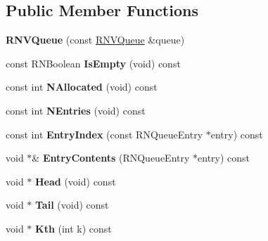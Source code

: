 \subsection*{Public Member Functions}
\begin{DoxyCompactItemize}
\item 
{\bfseries R\+N\+V\+Queue} (const \hyperlink{class_r_n_v_queue}{R\+N\+V\+Queue} \&queue)\hypertarget{class_r_n_v_queue_abbb0f5cc83d71dc73a498c4c40eacc3b}{}\label{class_r_n_v_queue_abbb0f5cc83d71dc73a498c4c40eacc3b}

\item 
const R\+N\+Boolean {\bfseries Is\+Empty} (void) const \hypertarget{class_r_n_v_queue_acb3c97678ea4be0dc74decf797638469}{}\label{class_r_n_v_queue_acb3c97678ea4be0dc74decf797638469}

\item 
const int {\bfseries N\+Allocated} (void) const \hypertarget{class_r_n_v_queue_afb793c596497bc183e14978413884596}{}\label{class_r_n_v_queue_afb793c596497bc183e14978413884596}

\item 
const int {\bfseries N\+Entries} (void) const \hypertarget{class_r_n_v_queue_a0f449d2de0b577f2bd34519676c8415f}{}\label{class_r_n_v_queue_a0f449d2de0b577f2bd34519676c8415f}

\item 
const int {\bfseries Entry\+Index} (const R\+N\+Queue\+Entry $\ast$entry) const \hypertarget{class_r_n_v_queue_a2ab0d22f2bbe1e10ef291481c87bd330}{}\label{class_r_n_v_queue_a2ab0d22f2bbe1e10ef291481c87bd330}

\item 
void $\ast$\& {\bfseries Entry\+Contents} (R\+N\+Queue\+Entry $\ast$entry) const \hypertarget{class_r_n_v_queue_a50787203aff078254775133cfe121ace}{}\label{class_r_n_v_queue_a50787203aff078254775133cfe121ace}

\item 
void $\ast$ {\bfseries Head} (void) const \hypertarget{class_r_n_v_queue_a8ab05e7926ea3cf8fb91533720ea8678}{}\label{class_r_n_v_queue_a8ab05e7926ea3cf8fb91533720ea8678}

\item 
void $\ast$ {\bfseries Tail} (void) const \hypertarget{class_r_n_v_queue_a807b78d9b5f4a9a3a3704e29a7948a6c}{}\label{class_r_n_v_queue_a807b78d9b5f4a9a3a3704e29a7948a6c}

\item 
void $\ast$ {\bfseries Kth} (int k) const \hypertarget{class_r_n_v_queue_acb43c2f08a61974638e1a9e02459a619}{}\label{class_r_n_v_queue_acb43c2f08a61974638e1a9e02459a619}


\end{DoxyCompactItemize}
